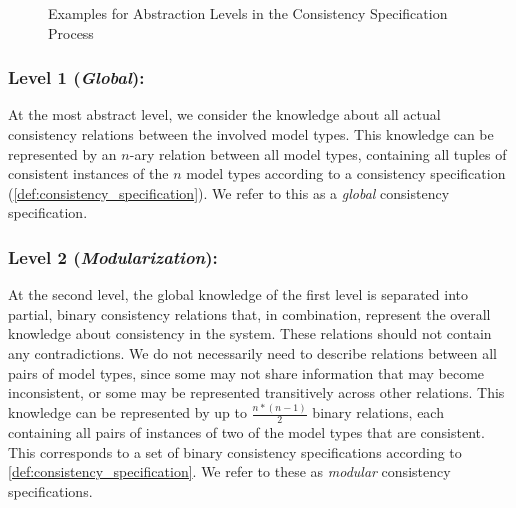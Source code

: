\begin{figure}
    \centering
    
    \caption{Examples for Abstraction Levels in the Consistency Specification Process}
    \label{fig:properties:levels_overview}
\end{figure}


\subsubsection*{Level 1 (\emph{Global}):}
At the most abstract level, we consider the knowledge about all actual consistency relations between the involved model types.
This knowledge can be represented by an $n$-ary relation between all model types, containing all tuples of consistent instances of the $n$ model types according to a consistency specification (\autoref{def:consistency_specification}). 
We refer to this as a \emph{global} consistency specification.

\subsubsection*{Level 2 (\emph{Modularization}):} 
At the second level, the global knowledge of the first level is separated into partial, binary consistency relations that, in combination, represent the overall knowledge about consistency in the system.
These relations should not contain any contradictions.
We do not necessarily need to describe relations between all pairs of model types, since some may not share information that may become inconsistent, or some may be represented transitively across other relations.
This knowledge 
can be represented by up to $\frac{n*(n-1)}{2}$ binary relations, each containing all pairs of instances of two of the model types that are consistent.
This corresponds to a set of binary consistency specifications according to \autoref{def:consistency_specification}.
We refer to these as \emph{modular} consistency specifications.\\[-1em]


